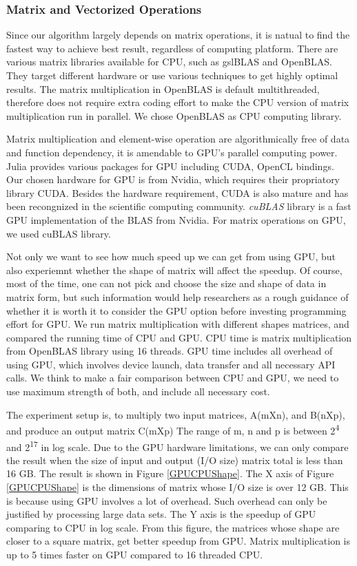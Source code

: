 \documentclass[9pt,twocolumn,twoside,lineno]{gsag3jnl}
\begin{document}
 
\subsubsection{Matrix and Vectorized Operations}

Since our algorithm largely depends on matrix operations, it is natual to find the fastest way to achieve best result, regardless of computing platform. 
There are various matrix libraries available for CPU, such as gslBLAS and OpenBLAS. 
They target different hardware or use various techniques to get highly optimal results. 
The matrix multiplication in OpenBLAS is default multithreaded, therefore does not require extra coding effort to make the CPU version of matrix multiplication run in parallel.
We chose OpenBLAS as CPU computing library.  

Matrix multiplication and element-wise operation are algorithmically free of data and function dependency, it is amendable to GPU's parallel computing power.
Julia provides various packages for GPU including CUDA, OpenCL bindings. 
Our chosen hardware for GPU is from Nvidia, which requires their propriatory library CUDA. 
Besides the hardware requirement, CUDA is also mature and has been recongnized in the scientific computing community. 
\textit{cuBLAS} library is a fast GPU implementation of the BLAS from Nvidia. 
For matrix operations on GPU, we used cuBLAS library. 

Not only we want to see how much speed up we can get from using GPU, but also experiemnt whether the shape of matrix will affect the speedup. 
Of course, most of the time, one can not pick and choose the size and shape of data in matrix form, 
but such information would help researchers as a rough guidance of whether it is worth it to consider the GPU option before investing programming effort for GPU. 
We run matrix multiplication with different shapes matrices, and compared the running time of CPU and GPU. 
CPU time is matrix multiplication from OpenBLAS library using 16 threads. 
GPU time includes all overhead of using GPU, which involves device launch, data transfer and all necessary API calls.
We think to make a fair comparison between CPU and GPU, we need to use maximum strength of both, and include all necessary cost. 

The experiment setup is, to multiply two input matrices, A(mXn), and B(nXp), and produce an output matrix C(mXp)
The range of m, n and p is between 2\textsuperscript{4} and 2\textsuperscript{17} in log scale.
Due to the GPU hardware limitations, we can only compare the result when the size of input and output (I/O size) matrix total is less than 16 GB. 
The result is shown in Figure \ref{GPUCPUShape}. 
The X axis of Figure \ref{GPUCPUShape} is the dimensions of matrix whose I/O size is over 12 GB.
This is because using GPU involves a lot of overhead. 
Such overhead can only be justified by processing large data sets. 
The Y axis is the speedup of GPU comparing to CPU in log scale.  
From this figure, the matrices whose shape are closer to a square matrix, get better speedup from GPU.
Matrix multiplication is up to 5 times faster on GPU compared to 16 threaded CPU. 
\end{document}
